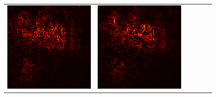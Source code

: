 \documentclass[preprint,12pt]{elsarticle}
\begin{document}
\begin{figure}[p]
\begin{tabular}{cccccc}
  \includegraphics[scale=\scale]{../visualizations/examples/imagenette/resnet18/positive_saliency_map/5.png} & 
  \includegraphics[scale=\scale]{../visualizations/examples/imagenette/resnet18/negative_saliency_map/5.png} & 

\end{tabular}
\end{figure}
\end{document}
